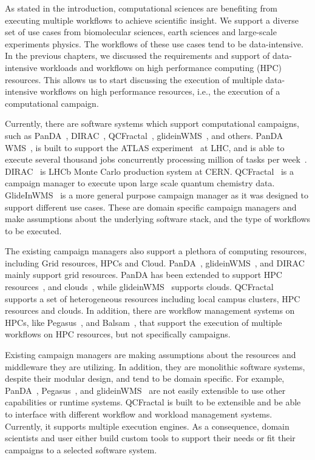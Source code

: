 \label{ch:cmanager}
As stated in the introduction, computational sciences are benefiting from executing multiple workflows to achieve scientific insight.
We support a diverse set of use cases from biomolecular sciences, earth sciences and large-scale experiments physics.
The workflows of these use cases tend to be data-intensive.
In the previous chapters, we discussed the requirements and support of data-intensive workloads and workflows on high performance computing (HPC) resources.
This allows us to start discussing the execution of multiple data-intensive workflows on high performance resources, i.e., the execution of a computational campaign.

Currently, there are software systems which support computational campaigns, such as PanDA~\cite{maeno2008panda}, DIRAC~\cite{casajus2010dirac}, QCFractal~\cite{qcfractal}, glideinWMS~\cite{sfiligoi2008glidein}, and others.
PanDA WMS~\cite{maeno2008panda}, is built to support the ATLAS experiment~\cite{atlas} at LHC, and is able to execute several thousand jobs concurrently processing million of tasks per week~\cite{de2015future}.
DIRAC~\cite{tsaregorodtsev2003dirac} is LHCb Monte Carlo production system at CERN.
QCFractal~\cite{qcfractal} is a campaign manager to execute upon large scale quantum chemistry data.
GlideInWMS~\cite{sfiligoi2008glidein} is a more general purpose campaign manager as it was designed to support different use cases.
These are domain specific campaign managers and make assumptions about the underlying software stack, and the type of workflows to be executed.

The existing campaign managers also support a plethora of computing resources, including Grid resources, HPCs and Cloud.
PanDA~\cite{maeno2008panda}, glideinWMS~\cite{sfiligoi2008glidein}, and DIRAC~\cite{casajus2010dirac} mainly support grid resources.
PanDA has been extended to support HPC resources~\cite{de2015future, de2016accelerating}, and clouds~\cite{de2016accelerating}, while glideinWMS~\cite{sfiligoi2008glidein} supports clouds.
QCFractal~\cite{qcfractal} supports a set of heterogeneous resources including local campus clusters, HPC resources and clouds.
In addition, there are workflow management systems on HPCs, like Pegasus~\cite{deelman2015pegasus}, and Balsam~\cite{salim2019balsam}, that support the execution of multiple workflows on HPC resources, but not specifically campaigns.

Existing campaign managers are making assumptions about the resources and middleware they are utilizing.
In addition, they are monolithic software systems, despite their modular design, and tend to be domain specific.
For example, PanDA~\cite{maeno2008panda}, Pegasus~\cite{deelman2015pegasus}, and glideinWMS~\cite{sfiligoi2008glidein} are not easily extensible to use other capabilities or runtime systems.
QCFractal is built to be extensible and be able to interface with different workflow and workload management systems. Currently, it supports multiple execution engines.
As a consequence, domain scientists and user either build custom tools to support their needs or fit their campaigns to a selected software system.

